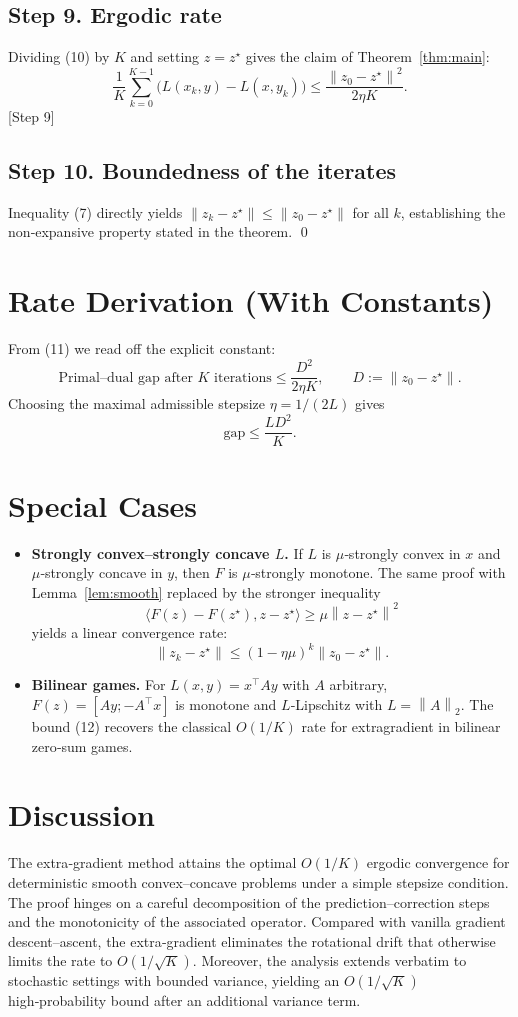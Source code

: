 \documentclass{article}
\newcommand{\norm}[1]{\left\lVert #1 \right\rVert}
\newcommand{\ip}[2]{\langle #1,#2\rangle}
\begin{document}
\subsection*{Step 9. Ergodic rate}
Dividing (10) by $K$ and setting $z=z^\star$ gives the claim of Theorem~\ref{thm:main}:
\[
\frac{1}{K}\sum_{k=0}^{K-1}\bigl(L(x_k,y)-L(x,y_k)\bigr)
\le \frac{\norm{z_0-z^\star}^{2}}{2\eta K}.
\tag{11}
\]
[Step 9]

\subsection*{Step 10. Boundedness of the iterates}
Inequality (7) directly yields $\norm{z_k-z^\star}\le\norm{z_0-z^\star}$ for all $k$, establishing the non‑expansive property stated in the theorem. \qed

\section*{Rate Derivation (With Constants)}
From (11) we read off the explicit constant:
\[
\text{Primal–dual gap after $K$ iterations}\le
\frac{D^{2}}{2\eta K},\qquad D:=\norm{z_0-z^\star}.
\]
Choosing the maximal admissible stepsize $\eta=1/(2L)$ gives
\[
\text{gap}\le \frac{L D^{2}}{K}.
\tag{12}
\]

\section*{Special Cases}
\begin{itemize}
\item \textbf{Strongly convex–strongly concave $L$.} If $L$ is $\mu$‑strongly convex in $x$ and $\mu$‑strongly concave in $y$, then $F$ is $\mu$‑strongly monotone. The same proof with Lemma~\ref{lem:smooth} replaced by the stronger inequality
\[
\ip{F(z)-F(z^\star)}{z-z^\star}\ge \mu\norm{z-z^\star}^{2}
\]
yields a linear convergence rate:
\[
\norm{z_{k}-z^\star}\le (1-\eta\mu)^{k}\norm{z_0-z^\star}.
\]
\item \textbf{Bilinear games.} For $L(x,y)=x^\top Ay$ with $A$ arbitrary, $F(z)=[Ay; -A^\top x]$ is monotone and $L$‑Lipschitz with $L=\norm{A}_2$. The bound (12) recovers the classical $O(1/K)$ rate for extragradient in bilinear zero‑sum games.
\end{itemize}

\section*{Discussion}
The extra‑gradient method attains the optimal $O(1/K)$ ergodic convergence for deterministic smooth convex–concave problems under a simple stepsize condition. The proof hinges on a careful decomposition of the prediction–correction steps and the monotonicity of the associated operator. Compared with vanilla gradient descent–ascent, the extra‑gradient eliminates the rotational drift that otherwise limits the rate to $O(1/\sqrt{K})$. Moreover, the analysis extends verbatim to stochastic settings with bounded variance, yielding an $O(1/\sqrt{K})$ high‑probability bound after an additional variance term.
\end{document}

